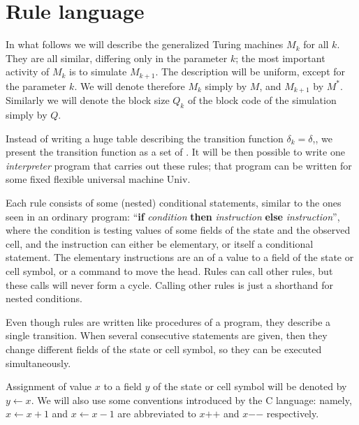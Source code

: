 \documentclass[12pt]{memoir}
\newcommand{\Un}{\mathrm{Univ}}
\newcommand{\increment}[1]{#1\mathord{+}\mathord{+}}
\newcommand{\decrement}[1]{#1\mathord{-}\mathord{-}}
\begin{document}
\section{Rule language}\label{sec:language}

In what follows we will describe the generalized Turing machines \( M_{k} \) for all \( k \).
They are all similar, differing only in the parameter \( k \); the most important activity
of \( M_{k} \) is to simulate \( M_{k+1} \).
The description will be uniform, except for the parameter \( k \).
We will denote therefore \( M_{k} \) simply by \( M \), and \( M_{k+1} \)  by \( M^{*} \).
Similarly we will denote the block size \( Q_{k} \) of the block code of the 
simulation simply by \( Q \).

Instead of writing a huge table describing the transition function \( \delta_{k}=\delta \),,
we present the transition function as a set of .
It will be then possible to write one \emph{interpreter} program that carries
out these rules; that program can be written for some fixed flexible 
universal machine \( \Un \).

Each rule consists of some (nested) conditional statements,
similar to the ones seen in an ordinary program:
 ``\textbf{if} \textit{condition} \textbf{then} \textit{instruction}
\textbf{else} \textit{instruction}'', 
where the condition
is testing values of some fields of the state and the observed cell, and
the instruction can either be elementary, or itself a conditional statement. 
The elementary instructions are an  of a value to a field
of the state or cell symbol, or a command to move the head.
Rules can call other rules, but these calls will never form a cycle.
Calling other rules is just a shorthand for nested conditions.

Even though rules are written like procedures of a program,
they describe a single transition.
When several consecutive statements are given, then they
change different fields of the state or
cell symbol, so they can be executed simultaneously.

Assignment of value \( x \) to a field \( y \) of the state or cell symbol will
be denoted by \( y \gets x \).
We will also use some conventions introduced by the C language:
namely,
\( x\gets x+1 \) and \( x\gets x-1 \) are abbreviated to \( \increment{x} \) and
\( \decrement{x} \) respectively.
\end{document}
